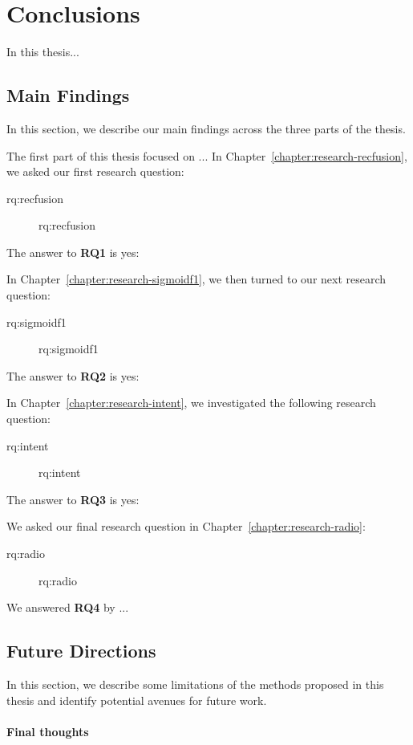 
\chapter{Conclusions}
\label{chapter:conclusions}

\acresetall
In this thesis...


\section{Main Findings}
\label{section:conclusion-findings}
In this section, we describe our main findings across the three parts of the thesis. 

The first part of this thesis focused on ...
In Chapter~\ref{chapter:research-recfusion}, we asked our first research question:

\begin{description}\item[\acs{rq:recfusion}]\acl{rq:recfusion}\end{description}

\noindent
The answer to \textbf{RQ1} is yes: 

In Chapter~\ref{chapter:research-sigmoidf1}, we then turned to our next research question:

\begin{description}\item[\acs{rq:sigmoidf1}]\acl{rq:sigmoidf1}\end{description}

\noindent
The answer to \textbf{RQ2} is yes:

In Chapter~\ref{chapter:research-intent}, we investigated the following research question:

\begin{description}\item[\acs{rq:intent}]\acl{rq:intent}\end{description}

\noindent
The answer to \textbf{RQ3} is yes: 

We asked our final research question in Chapter~\ref{chapter:research-radio}:

\begin{description}\item[\acs{rq:radio}]\acl{rq:radio}\end{description}

\noindent
We answered \textbf{RQ4} by ...

\section{Future Directions}
\label{section:conclusion-futurework}
In this section, we describe some limitations of the methods proposed in this thesis and identify potential avenues for future work. 

\pagebreak

\subsubsection{Final thoughts} 






